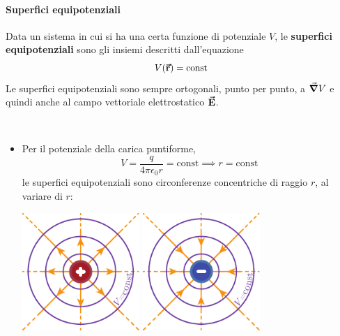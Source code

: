 \paragraph{Superfici equipotenziali}
\begin{define}
	Data un sistema in cui si ha una certa funzione di potenziale $V$, le \textbf{superfici equipotenziali} sono gli insiemi descritti dall'equazione
	\begin{equation}
		V(\vb*{\va{r}})=\textrm{const}
	\end{equation}
	Le superfici equipotenziali sono sempre ortogonali, punto per punto, a $\grad{V}$ e quindi anche al campo vettoriale elettrostatico $\vb*{\va{E}}$.
\end{define}
\begin{examples}~{}%
	\begin{itemize}
		\item Per il potenziale della carica puntiforme,
		\begin{equation*}
			V=\frac{q}{4\pi\epsilon_0r}=\mathrm{const}\implies r=\mathrm{const}
		\end{equation*}
		le superfici equipotenziali sono circonferenze concentriche di raggio $r$, al variare di $r$:
		\begin{center}
			\includegraphics[width=0.35\textwidth]{images/chp3potcampocoulomb1.pdf}\hspace{20pt}
			\includegraphics[width=0.35\textwidth]{images/chp3potcampocoulomb2.pdf}
		\end{center}

\end{itemize}
\end{examples}
